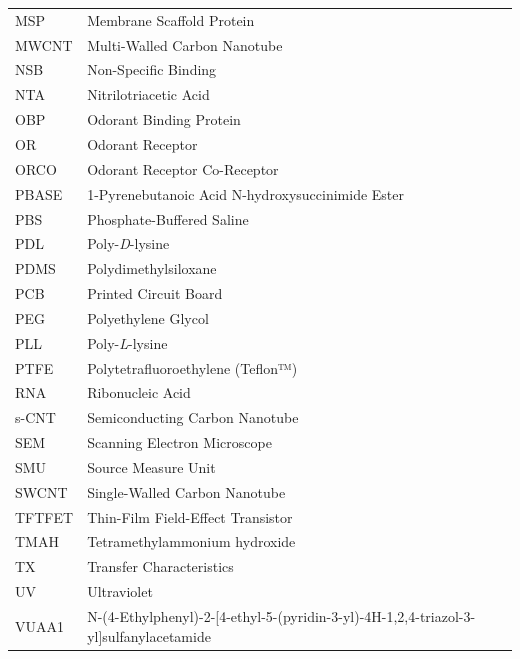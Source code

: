 \documentclass[
  a4paper,
]{scrbook}
\begin{document}
\newpage
\pagestyle{plain} %
\begin{table}[h]
  \begin{tabular}{@{}p{} p{}@{}}  %
    MSP  & Membrane Scaffold Protein  \\
    MWCNT  & Multi-Walled Carbon Nanotube   \\
    NSB  & Non-Specific Binding   \\
    NTA  & Nitrilotriacetic Acid   \\
    OBP  & Odorant Binding Protein  \\
    OR  & Odorant Receptor  \\
    ORCO  & Odorant Receptor Co-Receptor  \\
    PBASE  & 1-Pyrenebutanoic Acid N-hydroxysuccinimide Ester  \\ 
    PBS  & Phosphate-Buffered Saline  \\
    PDL & Poly-\textit{D}-lysine  \\
    PDMS  & Polydimethylsiloxane   \\ 
    PCB  & Printed Circuit Board   \\ 
    PEG  & Polyethylene Glycol  \\ 
    PLL  & Poly-\textit{L}-lysine  \\
    PTFE  & Polytetrafluoroethylene (Teflon™)  \\
    RNA  & Ribonucleic Acid   \\ 
    s-CNT  & Semiconducting Carbon Nanotube   \\
    SEM  & Scanning Electron Microscope   \\
    SMU  & Source Measure Unit   \\
    SWCNT  & Single-Walled Carbon Nanotube   \\
    TFTFET  & Thin-Film Field-Effect Transistor  \\
    TMAH  & Tetramethylammonium hydroxide  \\
    TX  & Transfer Characteristics  \\
    UV  & Ultraviolet \\
    VUAA1  & N-(4-Ethylphenyl)-2-{[4-ethyl-5-(pyridin-3-yl)-4H-1,2,4-triazol-3-yl]sulfanyl}acetamide  \\ 
  \end{tabular}
\end{table}

\clearpage
\newpage
\thispagestyle{empty} %
\mbox{~}
\clearpage
\newpage
\end{document}
